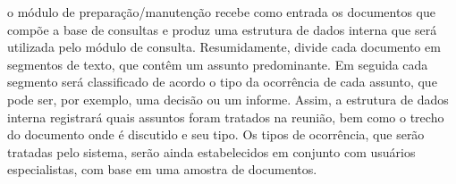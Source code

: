 







 




















o módulo de preparação/manutenção recebe como entrada os documentos que compõe a base de consultas e produz uma estrutura de dados interna que será utilizada pelo módulo de consulta. Resumidamente, divide cada documento em segmentos de texto, que contêm um assunto predominante. Em seguida cada segmento será classificado de acordo o tipo da ocorrência de cada assunto, que pode ser, por exemplo, uma decisão ou um informe. Assim, a estrutura de dados interna registrará quais assuntos foram tratados na reunião, bem como o trecho do documento onde é discutido e seu tipo. Os tipos de ocorrência, que serão tratadas pelo sistema, serão ainda estabelecidos em conjunto com usuários especialistas, com base em uma amostra de documentos.

